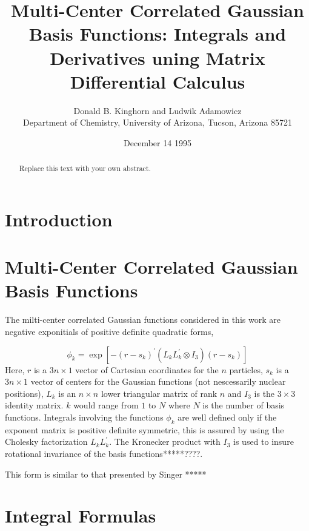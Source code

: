 \documentclass[12pt,thmsa]{article}
\begin{document}
\author{Donald B. Kinghorn and Ludwik Adamowicz \\
Department of Chemistry, University of Arizona, Tucson, Arizona 85721}
\title{Multi-Center Correlated Gaussian Basis Functions: Integrals and Derivatives
uning Matrix Differential Calculus }
\date{December 14 1995}
\maketitle

\begin{abstract}
Replace this text with your own abstract.
\end{abstract}

\section{Introduction}

\section{Multi-Center Correlated Gaussian Basis Functions}

The milti-center correlated Gaussian functions considered in this work are
negative exponitials of positive definite quadratic forms,

\begin{equation}
\phi _k=\exp \left[ -\left( r-s_k\right) ^{\prime }\left( L_kL_k^{\prime
}\otimes I_3\right) \left( r-s_k\right) \right]  \label{basisfcn}
\end{equation}
Here, $r$ is a $3n\times 1$ vector of Cartesian coordinates for the $n$
particles, $s_k$ is a $3n\times 1$ vector of centers for the Gaussian
functions (not nescessarily nuclear positions), $L_k$ is an $n\times n$
lower triangular matrix of rank $n$ and $I_3$ is the $3\times 3$ identity
matrix. $k$ would range from $1$ to $N$ where $N$ is the number of basis
functions. Integrals involving the functions $\phi _k$ are well defined only
if the exponent matrix is positive definite symmetric, this is assured by
using the Cholesky factorization $L_kL_k^{\prime }$. The Kronecker product
with $I_3$ is used to insure rotational invariance of the basis
functions*****????.

This form is similar to that presented by Singer\cite{Singer1} *****

\section{Integral Formulas}
\end{document}
